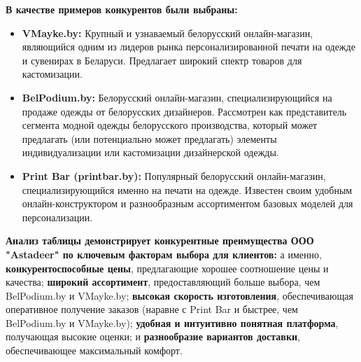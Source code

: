 \vspace{0.3cm}

\textbf{В качестве примеров конкурентов были выбраны:}

\begin{itemize}
    \item \textbf{VMayke.by:}  Крупный и узнаваемый белорусский онлайн-магазин, являющийся одним из лидеров рынка персонализированной печати на одежде и сувенирах в Беларуси.  Предлагает широкий спектр товаров для кастомизации.
    \item \textbf{BelPodium.by:}  Белорусский онлайн-магазин, специализирующийся на продаже одежды от белорусских дизайнеров.  Рассмотрен как представитель сегмента модной одежды белорусского производства, который может предлагать (или потенциально может предлагать) элементы индивидуализации или кастомизации дизайнерской одежды.
    \item \textbf{Print Bar (printbar.by):}  Популярный белорусский онлайн-магазин, специализирующийся именно на печати на одежде.  Известен своим удобным онлайн-конструктором и разнообразным ассортиментом базовых моделей для персонализации.
\end{itemize}

\vspace{0.3cm}

\textbf{Анализ таблицы демонстрирует конкурентные преимущества ООО "Astadeer" по ключевым факторам выбора для клиентов:}  а именно, \textbf{конкурентоспособные цены}, предлагающие хорошее соотношение цены и качества; \textbf{широкий ассортимент}, предоставляющий больше выбора, чем BelPodium.by и VMayke.by; \textbf{высокая скорость изготовления}, обеспечивающая оперативное получение заказов (наравне с Print Bar и быстрее, чем BelPodium.by и VMayke.by); \textbf{удобная и интуитивно понятная платформа}, получающая высокие оценки; и \textbf{разнообразие вариантов доставки}, обеспечивающее максимальный комфорт.